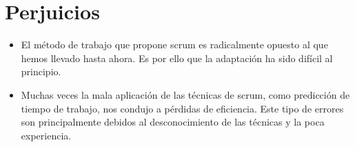 \documentclass[11pt,a4paper]{article}
\begin{document}
\section{Perjuicios}

\begin{itemize}

	\item El método de trabajo que propone scrum es radicalmente opuesto al que hemos llevado hasta ahora. Es por ello que la adaptación ha sido difícil al principio.
	
	\item Muchas veces la mala aplicación de las técnicas de scrum, como predicción de tiempo de trabajo, nos condujo a pérdidas de eficiencia. Este tipo de errores son principalmente debidos al desconocimiento de las técnicas y la poca experiencia. 

\end{itemize}
\end{document}
